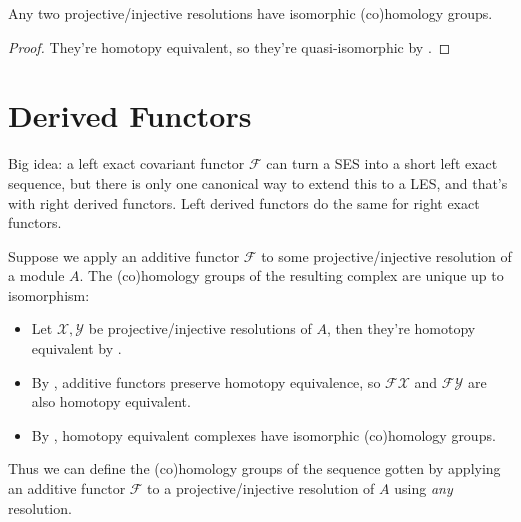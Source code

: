 \documentclass[twoside,10pt]{report}
\begin{document}
\begin{cor}
	Any two projective/injective resolutions have isomorphic (co)homology groups.
\end{cor}
\begin{proof}
	They're homotopy equivalent, so they're quasi-isomorphic by .
\end{proof}


\section{Derived Functors}

\begin{note}[]
Big idea: a left exact covariant functor $\mathcal{F}$ can turn a SES into a short left exact sequence, but there is only one canonical way to extend this to a LES, and that's with right derived functors. Left derived functors do the same for right exact functors. 
\end{note}

Suppose we apply an additive functor $\mathcal{F}$ to some projective/injective resolution of a module $A$. The (co)homology groups of the resulting complex are unique up to isomorphism:
\begin{itemize}
	\item Let $\mathcal{X},\mathcal{Y}$ be projective/injective resolutions of $A$, then they're homotopy equivalent by .
	\item By , additive functors preserve homotopy equivalence, so $\mathcal{F}\mathcal{X}$ and $\mathcal{F}\mathcal{Y}$ are also homotopy equivalent.
	\item By , homotopy equivalent complexes have isomorphic (co)homology groups.
\end{itemize}

Thus we can define the (co)homology groups of the sequence gotten by applying an additive functor $\mathcal{F}$ to a projective/injective resolution of $A$ using \textit{any} resolution.
\end{document}
